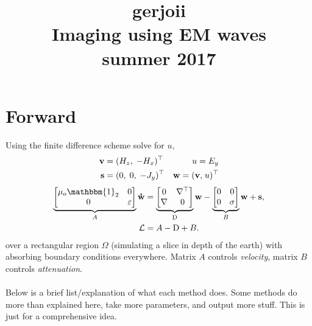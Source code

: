 \documentclass[a4paper,12pt]{article}
\title{\Huge{
\color{nblue}g\color{nred}er\color{ngreen}j\color{nblue}o\color{nred}i\color{moradoAmor}i}
\color{black}\\
Imaging using EM waves \\ \small{summer 2017}}
\author{}
\date{}
\begin{document}
\maketitle
\section{Forward}
Using the finite difference scheme solve for $u$,
\begin{align*}
\mathbf{v} &= (H_z,\; -H_x)^\top & u=E_y \\
 {\bf s}&=(0,\;0,\;-J_y)^\top & {\bf w=(v,}\;u)^\top
\end{align*}
%
%
%
\begin{align*}
%
\underbrace{
\begin{bmatrix}
\mu_o \mathbbm{1}_2 & 0 \\
0 & \varepsilon
\end{bmatrix}
}_{A}
%
{\bf \dot{w}}
&=
%
\underbrace{
\begin{bmatrix}
0 & \nabla^\top \\
\nabla & 0
\end{bmatrix}
}_{\mathrm{D}}
%
{\bf w} -
%
\underbrace{
\begin{bmatrix}
0 & 0 \\
0 & \sigma
\end{bmatrix}
}_B
%
{\bf w} +
%
{\bf s},\\
\mathcal{L} &= A-{\rm D}+B.
\end{align*}
over a rectangular region $\Omega$ (simulating a slice in depth of the earth) with absorbing boundary 
conditions everywhere. Matrix $A$ controls {\it velocity}, matrix $B$ controls {\it attenuation}.
\\\\
Below is a brief list/explanation of what each method does. Some methods do more than explained here, 
take more parameters, and output more stuff. This is just for a comprehensive idea.
\end{document}
